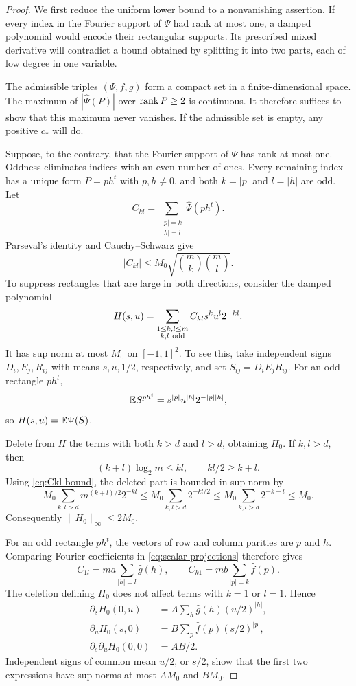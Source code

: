 \begin{proof}
We first reduce the uniform lower bound to a nonvanishing assertion.
If every index in the Fourier support of \(\Psi\) had rank at most one, a damped polynomial would encode
their rectangular supports. Its prescribed mixed derivative will
contradict a bound obtained by splitting it into two parts, each of
low degree in one variable.

The admissible triples \((\Psi,f,g)\) form a compact set in a
finite-dimensional space. The maximum of
\(|\widehat\Psi(P)|\) over \(\operatorname{rank} P\ge2\) is continuous.
It therefore suffices to show that this maximum never vanishes.
If the admissible set is empty, any positive \(c_*\) will do.

Suppose, to the contrary, that the Fourier support of \(\Psi\)
has rank at most one. Oddness eliminates indices with an even
number of ones. Every remaining index has a unique form
\(P=ph^t\) with \(p,h\ne0\), and both \(k=|p|\) and \(l=|h|\) are odd.
Let
\[
C_{kl}=\sum_{\substack{|p|=k\\|h|=l}}\widehat\Psi(ph^t).
\]
Parseval's identity and Cauchy--Schwarz give
\begin{equation}\label{eq:Ckl-bound}
|C_{kl}|\le M_0\sqrt{\binom mk\binom ml}.
\end{equation}
To suppress rectangles that are large in both directions, consider
the damped polynomial
\[
H(s,u)=\sum_{\substack{1\le k,l\le m\\ k,l\ {\rm odd}}}
C_{kl}s^ku^l2^{-kl}.
\]
It has sup norm at most \(M_0\) on \([-1,1]^2\).
To see this, take independent signs \(D_i,E_j,R_{ij}\) with
means \(s,u,1/2\), respectively, and set \(S_{ij}=D_iE_jR_{ij}\).
For an odd rectangle \(ph^t\),
\[
\mathbb E S^{ph^t}=s^{|p|}u^{|h|}2^{-|p||h|},
\]
so \(H(s,u)=\mathbb E\Psi(S)\).

Delete from \(H\) the terms with both \(k>d\) and \(l>d\), obtaining
\(H_0\). If \(k,l>d\), then
\[
(k+l)\log_2m\le kl,\qquad kl/2\ge k+l.
\]
Using \eqref{eq:Ckl-bound}, the deleted part is bounded in sup norm by
\[
M_0\sum_{k,l>d}m^{(k+l)/2}2^{-kl}
\le M_0\sum_{k,l>d}2^{-kl/2}
\le M_0\sum_{k,l>d}2^{-k-l}\le M_0.
\]
Consequently \(\|H_0\|_\infty\le2M_0\).

For an odd rectangle \(ph^t\), the vectors of row and column parities
are \(p\) and \(h\). Comparing Fourier coefficients in
\eqref{eq:scalar-projections} therefore gives
\[
C_{1l}=ma\sum_{|h|=l}\widehat g(h),\qquad
C_{k1}=mb\sum_{|p|=k}\widehat f(p).
\]
The deletion defining \(H_0\) does not affect terms with \(k=1\) or
\(l=1\). Hence
\begin{equation}\label{eq:H-derivatives}
\begin{split}
\partial_sH_0(0,u)&=A\sum_h\widehat g(h)(u/2)^{|h|},\\
\partial_uH_0(s,0)&=B\sum_p\widehat f(p)(s/2)^{|p|},\\
\partial_s\partial_uH_0(0,0)&=AB/2.
\end{split}
\end{equation}
Independent signs of common mean \(u/2\), or \(s/2\), show that
the first two expressions have sup norms at most \(AM_0\) and \(BM_0\).


\end{proof}
